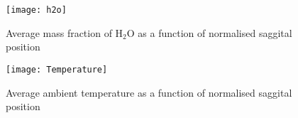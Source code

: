\begin{figure} 
  \texttt{[image: h2o]}
  \caption{Average mass fraction of $\mathrm{H_2 O}$ as a function of normalised saggital position}
  \label{fig:h2o}
\end{figure}


\begin{figure} 
  \texttt{[image: Temperature]}
  \caption{Average ambient temperature as a function of normalised saggital position}
  \label{fig:Temp}
\end{figure}
